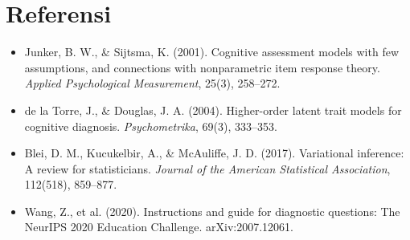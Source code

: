 \documentclass[11pt,a4paper]{article}
\begin{document}
\section{Referensi}
\begin{itemize}
  \item Junker, B. W., \& Sijtsma, K. (2001). Cognitive assessment models with few assumptions, and connections with
        nonparametric item response theory. \emph{Applied Psychological Measurement}, 25(3), 258--272.
  \item de la Torre, J., \& Douglas, J. A. (2004). Higher-order latent trait models for cognitive diagnosis.
        \emph{Psychometrika}, 69(3), 333--353.
  \item Blei, D. M., Kucukelbir, A., \& McAuliffe, J. D. (2017). Variational inference: A review for statisticians.
        \emph{Journal of the American Statistical Association}, 112(518), 859--877.
  \item Wang, Z., et al. (2020). Instructions and guide for diagnostic questions: The NeurIPS 2020 Education
        Challenge. arXiv:2007.12061.
\end{itemize}
\end{document}
